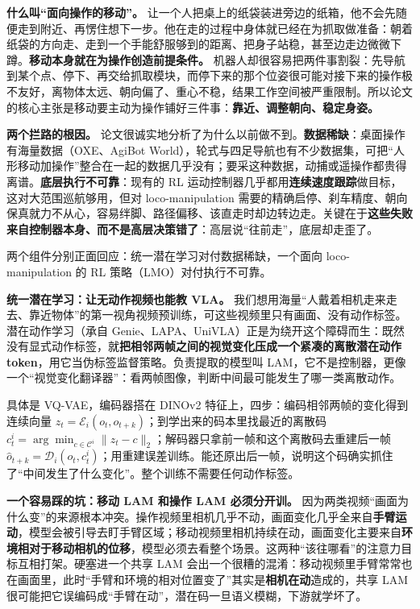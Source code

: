 \documentclass[
  chinese,
]{ctexart}
\begin{document}
\textbf{什么叫``面向操作的移动''。}
让一个人把桌上的纸袋装进旁边的纸箱，他不会先随便走到附近、再愣住想下一步。他在走的过程中身体就已经在为抓取做准备：朝着纸袋的方向走、走到一个手能舒服够到的距离、把身子站稳，甚至边走边微微下蹲。\textbf{移动本身就在为操作创造前提条件。}
机器人却很容易把两件事割裂：先导航到某个点、停下、再交给抓取模块，而停下来的那个位姿很可能对接下来的操作极不友好，离物体太远、朝向偏了、重心不稳，结果工作空间被严重限制。所以论文的核心主张是移动要主动为操作铺好三件事：\textbf{靠近、调整朝向、稳定身姿。}

\textbf{两个拦路的根因。}
论文很诚实地分析了为什么以前做不到。\textbf{数据稀缺}：桌面操作有海量数据（OXE、AgiBot
World），轮式与四足导航也有不少数据集，可把``人形移动加操作''整合在一起的数据几乎没有；要采这种数据，动捕或遥操作都贵得离谱。\textbf{底层执行不可靠}：现有的
RL
运动控制器几乎都用\textbf{连续速度跟踪}做目标，这对大范围巡航够用，但对
loco-manipulation
需要的精确启停、刹车精度、朝向保真就力不从心，容易绊脚、路径偏移、该直走时却边转边走。关键在于\textbf{这些失败来自控制器本身、而不是高层决策错了}：高层说``往前走''，底层却走歪了。

两个组件分别正面回应：统一潜在学习对付数据稀缺，一个面向
loco-manipulation 的 RL 策略（LMO）对付执行不可靠。

\textbf{统一潜在学习：让无动作视频也能教 VLA。}
我们想用海量``人戴着相机走来走去、靠近物体''的第一视角视频预训练，可这些视频里只有画面、没有动作标签。潜在动作学习（承自
Genie、LAPA、UniVLA）正是为绕开这个障碍而生：既然没有显式动作标签，就\textbf{把相邻两帧之间的视觉变化压成一个紧凑的离散潜在动作
token}，用它当伪标签监督策略。负责提取的模型叫
LAM，它不是控制器，更像一个``视觉变化翻译器''：看两帧图像，判断中间最可能发生了哪一类离散动作。

具体是 VQ-VAE，编码器搭在 DINOv2
特征上，四步：编码相邻两帧的变化得到连续向量
\(z_t = \mathcal{E}_i(o_t, o_{t+k})\)；到学出来的码本里找最近的离散码
\(c_t^i = \arg\min_{c \in \mathcal{C}^i} \|z_t - c\|_2\)；解码器只拿前一帧和这个离散码去重建后一帧
\(\hat{o}_{t+k} = \mathcal{D}_i(o_t, c_t^i)\)；用重建误差训练。能还原出后一帧，说明这个码确实抓住了``中间发生了什么变化''。整个训练不需要任何动作标签。

\textbf{一个容易踩的坑：移动 LAM 和操作 LAM 必须分开训。}
因为两类视频``画面为什么变''的来源根本冲突。操作视频里相机几乎不动，画面变化几乎全来自\textbf{手臂运动}，模型会被引导去盯手臂区域；移动视频里相机持续在动，画面变化主要来自\textbf{环境相对于移动相机的位移}，模型必须去看整个场景。这两种``该往哪看''的注意力目标互相打架。硬塞进一个共享
LAM
会出一个很糟的混淆：移动视频里手臂常常也在画面里，此时``手臂和环境的相对位置变了''其实是\textbf{相机在动}造成的，共享
LAM 很可能把它误编码成``手臂在动''，潜在码一旦语义模糊，下游就学坏了。
\end{document}
